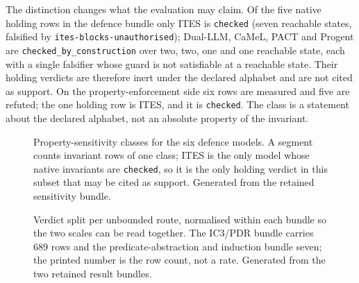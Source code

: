 \documentclass[11pt]{article}
\begin{document}
The distinction changes what the evaluation may claim. Of the five native holding
rows in the defence bundle only ITES is \texttt{checked} (seven reachable states,
falsified by \texttt{ites-blocks-unauthorised}); Dual-LLM, CaMeL, PACT and Progent
are \texttt{checked\_by\_construction} over two, two, one and one reachable state,
each with a single falsifier whose guard is not satisfiable at a reachable state.
Their holding verdicts are therefore inert under the declared alphabet and are not
cited as support. On the property-enforcement side six rows are measured and five
are refuted; the one holding row is ITES, and it is \texttt{checked}. The class is
a statement about the declared alphabet, not an absolute property of the
invariant.

\begin{figure}[t]
\centering

\caption{Property-sensitivity classes for the six defence models. A segment counts
invariant rows of one class; ITES is the only model whose native invariants are
\texttt{checked}, so it is the only holding verdict in this subset that may be cited
as support. Generated from the retained sensitivity bundle.}
\label{fig:property-sensitivity}
\end{figure}

\begin{figure}[t]
\centering

\caption{Verdict split per unbounded route, normalised within each bundle so the two
scales can be read together. The IC3/PDR bundle carries 689 rows and the
predicate-abstraction and induction bundle seven; the printed number is the row
count, not a rate. Generated from the two retained result bundles.}
\label{fig:unbounded-routes}
\end{figure}
\end{document}
